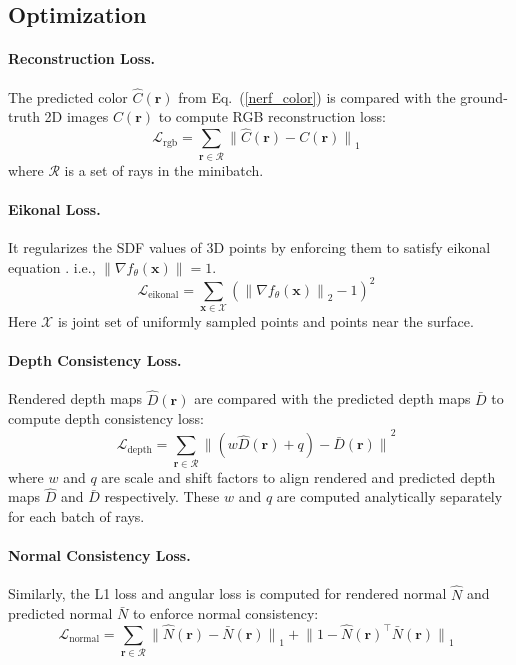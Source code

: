 \documentclass[a4paper]{paper}
\renewcommand{\eqref}[1]{Eq.~(\ref{#1})}
\begin{document}
\subsection{Optimization}\label{optimization}
\paragraph{Reconstruction Loss.} The predicted color $\hat{C}(\mathbf{r})$ from \eqref{nerf_color} is compared with the ground-truth 2D images $C(\mathbf{r})$ to compute RGB reconstruction loss:
\begin{equation}
\mathcal{L}_\text{rgb} = \sum_{\mathbf{r} \in \mathcal{R}} {\lVert \hat{C}(\mathbf{r}) - C(\mathbf{r}) \rVert}_1 \enspace  %
\end{equation}
where $\mathcal{R}$ is a set of rays in the minibatch.

\paragraph{Eikonal Loss.} It regularizes the SDF values of 3D points by enforcing them to satisfy eikonal equation \cite{gropp2020implicit}. i.e., $\lVert \nabla f_\theta(\mathbf{x}) \rVert = \text{1}$.
\begin{equation}
\mathcal{L}_\text{eikonal} = \sum_{\mathbf{x} \in \mathcal{X}} ({\lVert \nabla f_\theta(\mathbf{x}) \rVert}_2 - 1)^2 \enspace
\end{equation}
Here $\mathcal{X}$ is joint set of uniformly sampled points and points near the surface.

\paragraph{Depth Consistency Loss.} Rendered depth maps $\hat{D}(\mathbf{r})$ are compared with the predicted depth maps $\bar{D}$ to compute depth consistency loss:
\begin{equation}
\mathcal{L}_\text{depth} = \sum_{\mathbf{r} \in \mathcal{R}} {\lVert (w \hat{D}(\mathbf{r}) + q) - \bar{D}(\mathbf{r}) \rVert}^2 \enspace  \label{depth_loss}
\end{equation}
where $w$ and $q$ are scale and shift factors to align rendered and predicted depth maps $\hat{D}$ and $\bar{D}$ respectively. These $w$ and $q$ are computed analytically separately for each batch of rays.

\paragraph{Normal Consistency Loss.} Similarly, the L1 loss and angular loss is computed for rendered normal $\hat{N}$ and predicted normal $\bar{N}$ to enforce normal consistency:
\begin{equation}
\mathcal{L}_\text{normal} = \sum_{\mathbf{r} \in \mathcal{R}} {\lVert \hat{N}(\mathbf{r}) - \bar{N}(\mathbf{r}) \rVert}_1 +  {\lVert  1 - \hat{N}(\mathbf{r})^\top  \bar{N}(\mathbf{r}) \rVert}_1 \enspace 
\end{equation}
\end{document}
